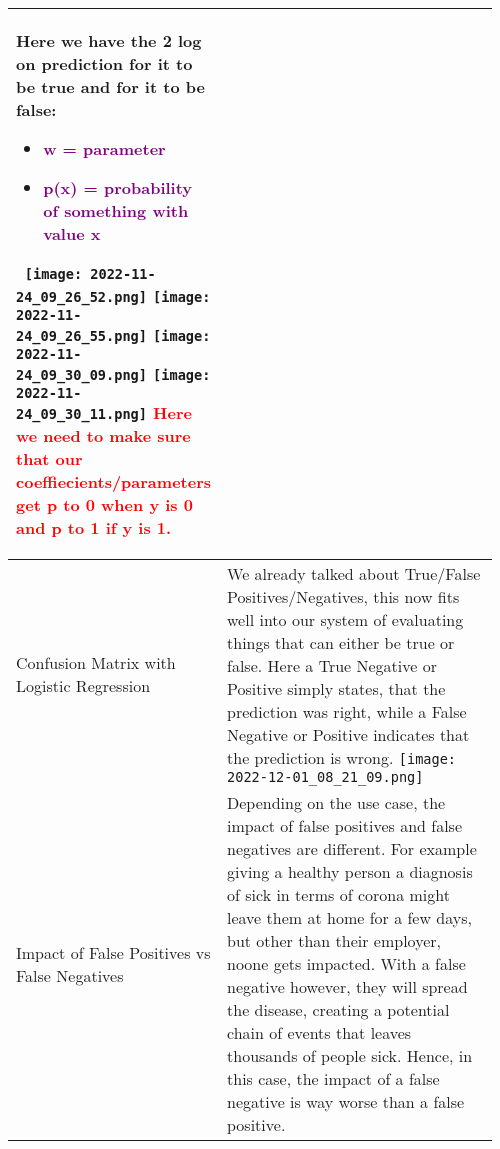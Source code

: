 \documentclass[main.tex,fontsize=8pt,paper=a4,paper=portrait,DIV=calc,]{scrartcl}
\begin{document}
\begin{table}[ht!]
\begin{tabular}{|m{0.2\linewidth}|m{0.755\linewidth}|}
Here we have the 2 log on prediction for it to be true and for it to be false:\newline 
\begin{itemize}
\item \textcolor{purple}{w = parameter}
\item \textcolor{purple}{p(x) = probability of something with value x}
\vspace{-3mm}
\end{itemize}
\, \newline
\texttt{[image: 2022-11-24\_09\_26\_52.png]} \texttt{[image: 2022-11-24\_09\_26\_55.png]}\newline
\texttt{[image: 2022-11-24\_09\_30\_09.png]} \texttt{[image: 2022-11-24\_09\_30\_11.png]}\newline
\textcolor{red}{Here we need to make sure that our coeffiecients/parameters get p to 0 when y is 0 and p to 1 if y is 1.}\newline
\\
\hline
Confusion Matrix with Logistic Regression & 
We already talked about True/False Positives/Negatives, this now fits well into our system of evaluating things that can either be true or false.\newline
Here a True Negative or Positive simply states, that the prediction was right, while a False Negative or Positive indicates that the prediction is wrong.\newline
\texttt{[image: 2022-12-01\_08\_21\_09.png]}\\
\hline
Impact of False Positives vs False Negatives & 
Depending on the use case, the impact of false positives and false negatives are different. For example giving a healthy person a diagnosis of sick in terms of corona might leave them at home for a few days, but other than their employer, noone gets impacted. With a false negative however, they will spread the disease, creating a potential chain of events that leaves thousands of people sick. Hence, in this case, the impact of a false negative is way worse than a false positive.\\
\hline
\end{tabular}
\end{table}
\pagebreak 
\end{document}
